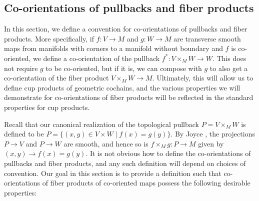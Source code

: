 \subsection{Co-orientations of pullbacks and fiber products}\label{S: co-orient pullbacks}

In this section, we define a convention for co-orientations of pullbacks and fiber products.
More specifically, if $f \colon V \to M$ and $g \colon W \to M$ are transverse smooth maps from manifolds with corners to a manifold without boundary and $f$ is co-oriented, we define a co-orientation of the pullback $f^* \colon V \times_M W \to W$.
This does not require $g$ to be co-oriented, but if it is, we can compose with $g$ to also get a co-orientation of the fiber product $V \times_M W \to M$.
Ultimately, this will allow us to define cup products of geometric cochains, and the various properties we will demonstrate for co-orientations of fiber products will be reflected in the standard properties for cup products.

Recall that our canonical realization of the topological pullback $P = V \times_M W$ is defined to be $P = \{(x,y) \in V \times W \mid f(x) = g(y)\}$.
By Joyce \cite[Section 6]{Joy12}, the projections $P \to V$ and $P \to W$ are smooth, and hence so is $f \times_M g \colon P \to M$ given by $(x,y) \to f(x) = g(y)$.
It is not obvious how to define the co-orientations of pullbacks and fiber products, and any such definition will depend on choices of convention.
Our goal in this section is to provide a definition such that co-orientations of fiber products of co-oriented maps possess the following desirable properties:

